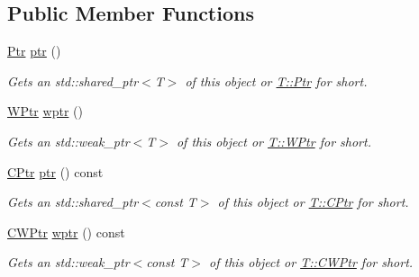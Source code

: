 \subsection*{Public Member Functions}
\begin{DoxyCompactItemize}
\item 
\hyperlink{classdg_1_1deepcore_1_1_object_t_ab54805874b0d6881bc1d1a2ced7d49bf}{Ptr} \hyperlink{classdg_1_1deepcore_1_1_object_t_ab2513323757cee301fb419901535f7b1}{ptr} ()
\begin{DoxyCompactList}\small\item\em Gets an std\+::shared\+\_\+ptr$<$\+T$>$ of this object or \hyperlink{classdg_1_1deepcore_1_1_object_t_ab54805874b0d6881bc1d1a2ced7d49bf}{T\+:\+:Ptr} for short. \end{DoxyCompactList}\item 
\hyperlink{classdg_1_1deepcore_1_1_object_t_a7cf2958227ec5d42c71a74562af4e3b8}{W\+Ptr} \hyperlink{classdg_1_1deepcore_1_1_object_t_aef2b72b73c1d2ab53aebd00742fedfa2}{wptr} ()
\begin{DoxyCompactList}\small\item\em Gets an std\+::weak\+\_\+ptr$<$\+T$>$ of this object or \hyperlink{classdg_1_1deepcore_1_1_object_t_a7cf2958227ec5d42c71a74562af4e3b8}{T\+:\+:W\+Ptr} for short. \end{DoxyCompactList}\item 
\hyperlink{classdg_1_1deepcore_1_1_object_t_a91edf1cc372d9a68025bed01f08d3a38}{C\+Ptr} \hyperlink{classdg_1_1deepcore_1_1_object_t_a95a616000ba2f001681cb3e5211705da}{ptr} () const 
\begin{DoxyCompactList}\small\item\em Gets an std\+::shared\+\_\+ptr$<$const T$>$ of this object or \hyperlink{classdg_1_1deepcore_1_1_object_t_a91edf1cc372d9a68025bed01f08d3a38}{T\+:\+:C\+Ptr} for short. \end{DoxyCompactList}\item 
\hyperlink{classdg_1_1deepcore_1_1_object_t_a03f850606335b509cb5bcb296ac18b62}{C\+W\+Ptr} \hyperlink{classdg_1_1deepcore_1_1_object_t_a8ca1649bb42a134bec66e541a1a373e9}{wptr} () const 
\begin{DoxyCompactList}\small\item\em Gets an std\+::weak\+\_\+ptr$<$const T$>$ of this object or \hyperlink{classdg_1_1deepcore_1_1_object_t_a03f850606335b509cb5bcb296ac18b62}{T\+:\+:C\+W\+Ptr} for short. \end{DoxyCompactList}\end{DoxyCompactItemize}
